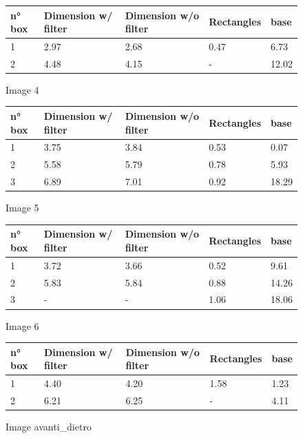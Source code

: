 \documentclass{article}
\begin{document}
\begin{figure}[H]
    \centering
    \begin{tabularx}{\textwidth}{||X X X X X||} 
        \hline
     n° box & Dimension w/ filter & Dimension w/o filter & Rectangles & base \\ [0.5ex]
     \hline\hline
     1 & 2.97 & 2.68 & 0.47 & 6.73 \\ 
     \hline
     2 & 4.48 & 4.15 & - & 12.02 \\
     \hline
    \end{tabularx}
     \caption{Image 4}
\end{figure}

\begin{figure}[H]
    \centering
   \begin{tabularx}{\textwidth}{||X X X X X||} 
        \hline
     n° box & Dimension w/ filter & Dimension w/o filter & Rectangles & base \\ [0.5ex]
     \hline\hline
     1 & 3.75 & 3.84 & 0.53 & 0.07 \\ 
     \hline
     2 & 5.58 & 5.79 & 0.78 & 5.93 \\
     \hline
     3 & 6.89 & 7.01 & 0.92 & 18.29 \\
     \hline
    \end{tabularx}
     \caption{Image 5}
\end{figure}

\begin{figure}[H]
    \centering
   \begin{tabularx}{\textwidth}{||X X X X X||} 
        \hline
     n° box & Dimension w/ filter & Dimension w/o filter & Rectangles & base \\ [0.5ex]
     \hline\hline
     1 & 3.72 & 3.66 & 0.52 & 9.61 \\ 
     \hline
     2 & 5.83 & 5.84 & 0.88 & 14.26 \\
     \hline
     3 & - & - & 1.06 & 18.06 \\
     \hline
    \end{tabularx}
     \caption{Image 6}
\end{figure}

\begin{figure}[H]
    \centering
    \begin{tabularx}{\textwidth}{||X X X X X||} 
        \hline
     n° box & Dimension w/ filter & Dimension w/o filter & Rectangles & base \\ [0.5ex]
     \hline\hline
     1 & 4.40 & 4.20 & 1.58 & 1.23 \\ 
     \hline
     2 & 6.21 & 6.25 & - & 4.11 \\
     \hline
    \end{tabularx}
     \caption{Image avanti\_dietro}
\end{figure}
\end{document}
